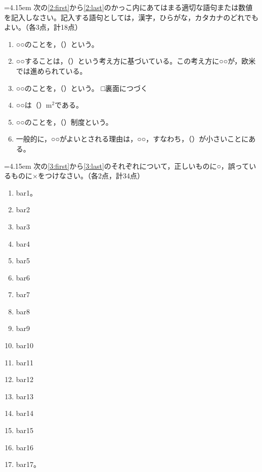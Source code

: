 \documentclass[10pt,a4j,uplatex]{jsarticle}
\newenvironment{question}[1]{%
	\noindent\hangindent=4.15em\hangafter=1{\setlength{\fboxrule}{.4pt}\fbox{\mgfamily\textbf{問題 #1}}}\hspace{.5zw}}%
	{\vspace{.1\baselineskip}}
\begin{document}
\vfill

\begin{question}{２}
次の{\ref{2:first}}から{\ref{2:last}}のかっこ内にあてはまる適切な語句または数値を記入しなさい。記入する語句としては，漢字，ひらがな，カタカナのどれでもよい。（各3点，計18点）

\begin{enumerate}
	\item ○○のことを，（\qquad\qquad\qquad ）という。\label{2:first}
	\item ○○することは，（\qquad\qquad\qquad ）という考え方に基づいている。この考え方に○○が，欧米では進められている。
	\item ○○のことを，（\qquad\qquad\qquad ）という。
\vfill
\hfill □\llap{\ajCheckmark}裏面につづく
\newpage
	\item ○○は（\qquad\qquad\qquad ）$\textrm{m}^2$である。
	\item ○○のことを，（\qquad\qquad\qquad ）制度という。
	\item 一般的に，○○がよいとされる理由は，○○，すなわち，（\qquad\qquad\qquad ）が小さいことにある。\label{2:last}
\end{enumerate}
\end{question}


\vspace{2\baselineskip}
\begin{question}{３}
次の{\ref{3:first}}から{\ref{3:last}}のそれぞれについて，正しいものに○，誤っているものに×をつけなさい。（各2点，計34点）

\begin{enumerate}
	\item bar1。\label{3:first}
	\item bar2
	\item bar3
	\item bar4
	\item bar5
\vspace{.5\baselineskip}
	\item bar6
	\item bar7
	\item bar8
	\item bar9
	\item bar10
\vspace{.5\baselineskip}
	\item bar11
	\item bar12
	\item bar13
	\item bar14
	\item bar15
\vspace{.5\baselineskip}
	\item bar16
	\item bar17。\label{3:last}
\end{enumerate}
\end{question}
\end{document}
